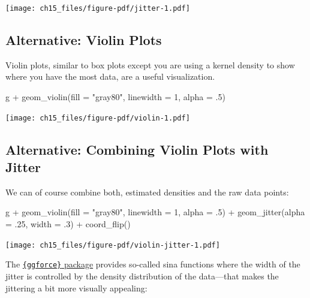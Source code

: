 \documentclass[
  letterpaper,
]{scrbook}
\newenvironment{Shaded}{\begin{snugshade}}{\end{snugshade}}
\newcommand{\AttributeTok}[1]{\textcolor[rgb]{0.40,0.45,0.13}{#1}}
\newcommand{\DecValTok}[1]{\textcolor[rgb]{0.68,0.00,0.00}{#1}}
\newcommand{\FunctionTok}[1]{\textcolor[rgb]{0.28,0.35,0.67}{#1}}
\newcommand{\NormalTok}[1]{\textcolor[rgb]{0.00,0.23,0.31}{#1}}
\newcommand{\SpecialCharTok}[1]{\textcolor[rgb]{0.37,0.37,0.37}{#1}}
\newcommand{\StringTok}[1]{\textcolor[rgb]{0.13,0.47,0.30}{#1}}
\begin{document}
\texttt{[image: ch15\_files/figure-pdf/jitter-1.pdf]}

\subsection{Alternative: Violin Plots}\label{alternative-violin-plots}

Violin plots, similar to box plots except you are using a kernel density
to show where you have the most data, are a useful visualization.

\begin{Shaded}
\begin{Highlighting}[]
\NormalTok{g }\SpecialCharTok{+} \FunctionTok{geom\_violin}\NormalTok{(}\AttributeTok{fill =} \StringTok{"gray80"}\NormalTok{, }\AttributeTok{linewidth =} \DecValTok{1}\NormalTok{, }\AttributeTok{alpha =}\NormalTok{ .}\DecValTok{5}\NormalTok{)}
\end{Highlighting}
\end{Shaded}

\texttt{[image: ch15\_files/figure-pdf/violin-1.pdf]}

\subsection{Alternative: Combining Violin Plots with
Jitter}\label{alternative-combining-violin-plots-with-jitter}

We can of course combine both, estimated densities and the raw data
points:

\begin{Shaded}
\begin{Highlighting}[]
\NormalTok{g }\SpecialCharTok{+} \FunctionTok{geom\_violin}\NormalTok{(}\AttributeTok{fill =} \StringTok{"gray80"}\NormalTok{, }\AttributeTok{linewidth =} \DecValTok{1}\NormalTok{, }\AttributeTok{alpha =}\NormalTok{ .}\DecValTok{5}\NormalTok{) }\SpecialCharTok{+}
    \FunctionTok{geom\_jitter}\NormalTok{(}\AttributeTok{alpha =}\NormalTok{ .}\DecValTok{25}\NormalTok{, }\AttributeTok{width =}\NormalTok{ .}\DecValTok{3}\NormalTok{) }\SpecialCharTok{+}
    \FunctionTok{coord\_flip}\NormalTok{()}
\end{Highlighting}
\end{Shaded}

\texttt{[image: ch15\_files/figure-pdf/violin-jitter-1.pdf]}

The \href{https://ggforce.data-imaginist.com/}{\texttt{\{ggforce\}}
package} provides so-called sina functions where the width of the jitter
is controlled by the density distribution of the data---that makes the
jittering a bit more visually appealing:
\end{document}
